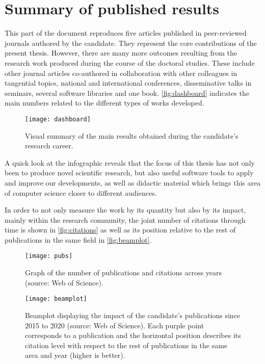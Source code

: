 \setchapterpreamble[u]{\margintoc}
\chapter{Summary of published results}
\label{ch:summary}

This part of the document reproduces five articles published in peer-reviewed journals authored by the candidate. They represent the core contributions of the present thesis. However, there are many more outcomes resulting from the research work produced during the course of the doctoral studies. These include other journal articles co-authored in collaboration with other colleagues in tangential topics, national and international conferences, disseminative talks in seminars, several software libraries and one book. \autoref{fig:dashboard} indicates the main numbers related to the different types of works developed.

\begin{figure*}[htbp]
    \texttt{[image: dashboard]}
    \caption{\label{fig:dashboard}Visual summary of the main results obtained during the candidate's research career.}
\end{figure*}

A quick look at the infographic reveals that the focus of this thesis has not only been to produce novel scientific research, but also useful software tools to apply and improve our developments, as well as didactic material which brings this area of computer science closer to different audiences.

In order to not only measure the work by its quantity but also by its impact, mainly within the research community, the joint number of citations through time is shown in \autoref{fig:citations} as well as its position relative to the rest of publications in the same field in \autoref{fig:beamplot}.~

\begin{figure*}[ht!]
    \texttt{[image: pubs]}
    \caption[Graph of the number of publications and citations across years.]{\label{fig:citations}Graph of the number of publications and citations across years (source: Web of Science).}
\end{figure*}
\begin{figure}[hb!]
    \texttt{[image: beamplot]}
    \caption[Beamplot displaying the impact of the candidate's publications.]{\label{fig:beamplot}Beamplot displaying the impact of the candidate's publications since 2015 to 2020 (source: Web of Science). Each purple point corresponds to a publication and the horizontal position describes its citation level with respect to the rest of publications in the same area and year (higher is better).}
\end{figure}

